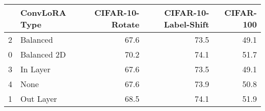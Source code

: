 \begin{tabular}{llrrr}
\toprule
 & ConvLoRA Type & CIFAR-10-Rotate & CIFAR-10-Label-Shift & CIFAR-100 \\
\midrule
2 & Balanced & 67.6 & 73.5 & 49.1 \\
0 & Balanced 2D & 70.2 & 74.1 & 51.7 \\
3 & In Layer & 67.6 & 73.5 & 49.1 \\
4 & None & 67.6 & 73.9 & 50.8 \\
1 & Out Layer & 68.5 & 74.1 & 51.9 \\
\bottomrule
\end{tabular}

